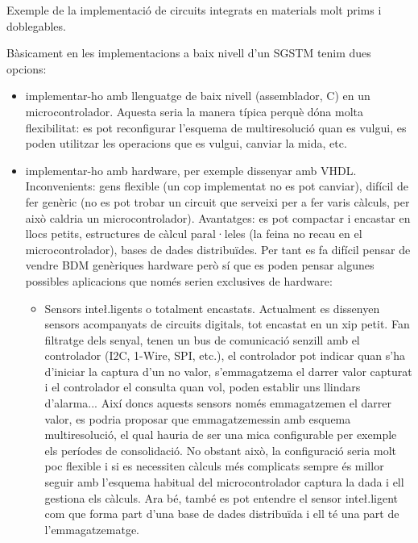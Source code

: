 Exemple de la implementació de circuits integrats en materials molt prims i doblegables.




Bàsicament en les implementacions a baix nivell d'un SGSTM tenim dues opcions:

\begin{itemize}
\item implementar-ho amb llenguatge de baix nivell (assemblador, C) en un microcontrolador. Aquesta seria la manera típica perquè dóna molta flexibilitat: es pot reconfigurar l'esquema de multiresolució quan es vulgui, es poden utilitzar les operacions que es vulgui, canviar la mida, etc. 

\item implementar-ho amb hardware, per exemple dissenyar amb
  VHDL. Inconvenients: gens flexible (un cop implementat no es pot
  canviar), difícil de fer genèric (no es pot trobar un circuit que
  serveixi per a fer varis càlculs, per això caldria un
  microcontrolador). Avantatges: es pot compactar i encastar en
  llocs petits, estructures de càlcul paral·leles (la feina no recau
  en el microcontrolador), bases de dades distribuïdes. Per tant es fa
  difícil pensar de vendre BDM genèriques hardware però sí que es
  poden pensar algunes possibles aplicacions que només serien
  exclusives de hardware:

  \begin{itemize}
  \item Sensors inte\l.ligents o totalment encastats. Actualment es
    dissenyen sensors acompanyats de circuits digitals, tot encastat
    en un xip petit. Fan filtratge dels senyal, tenen un bus de
    comunicació senzill amb el controlador (I2C, 1-Wire, SPI, etc.), el
    controlador pot indicar quan s'ha d'iniciar la captura d'un no
    valor, s'emmagatzema el darrer valor capturat i el controlador el
    consulta quan vol, poden establir uns llindars d'alarma... Així
    doncs aquests sensors només emmagatzemen el darrer valor, es
    podria proposar que emmagatzemessin amb esquema multiresolució, el
    qual hauria de ser una mica configurable per exemple els períodes
    de consolidació. No obstant això, la configuració seria molt poc
    flexible i si es necessiten càlculs més complicats sempre és
    millor seguir amb l'esquema habitual del microcontrolador captura
    la dada i ell gestiona els càlculs. Ara bé, també es pot entendre
    el sensor inte\l.ligent com que forma part d'una base de dades
    distribuïda i ell té una part de l'emmagatzematge. 
    

\end{itemize}
\end{itemize}
